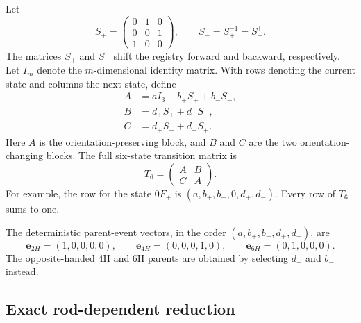 Let
\begin{equation}
 S_+=\begin{pmatrix}0&1&0\\0&0&1\\1&0&0\end{pmatrix},\qquad
 S_-=S_+^{-1}=S_+^{\mathsf T}.
 \label{eq:si_pbi2_shift_matrices}
\end{equation}
The matrices $S_+$ and $S_-$ shift the registry forward and backward, respectively. Let $I_m$ denote the $m$-dimensional identity matrix. With rows denoting the current state and columns the next state, define
\begin{align}
 A&=aI_3+b_+S_+ +b_-S_-,\\
 B&=d_+S_+ +d_-S_-,\\
 C&=d_+S_- +d_-S_+.
\end{align}
Here $A$ is the orientation-preserving block, and $B$ and $C$ are the two orientation-changing blocks. The full six-state transition matrix is
\begin{equation}
 T_6=\begin{pmatrix}A&B\\C&A\end{pmatrix}.
 \label{eq:si_pbi2_T6}
\end{equation}
For example, the row for the state $0F_+$ is
$(a,b_+,b_-,0,d_+,d_-)$.  Every row of $T_6$ sums to one.

The deterministic parent-event vectors, in the order
$(a,b_+,b_-,d_+,d_-)$, are
\begin{equation}
 \mathbf e_{2H}=(1,0,0,0,0),\qquad
 \mathbf e_{4H}=(0,0,0,1,0),\qquad
 \mathbf e_{6H}=(0,1,0,0,0).
 \label{eq:si_pbi2_parent_vectors}
\end{equation}
The opposite-handed 4H and 6H parents are obtained by selecting $d_-$ and
$b_-$ instead.

\subsection{Exact rod-dependent reduction}

